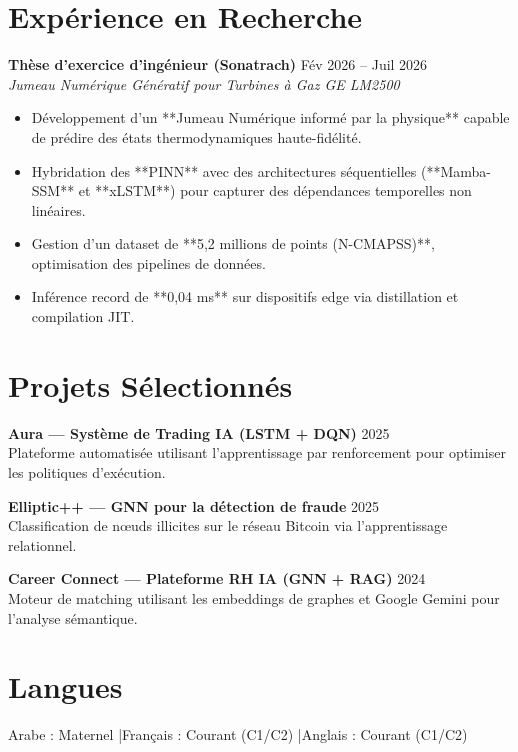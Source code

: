 \documentclass[a4paper,11pt]{article}
\begin{document}
\section{Expérience en Recherche}
\textbf{Thèse d'exercice d'ingénieur (Sonatrach)} \hfill Fév 2026 -- Juil 2026 \\
\textit{Jumeau Numérique Génératif pour Turbines à Gaz GE LM2500}
\begin{itemize}
    \item Développement d'un **Jumeau Numérique informé par la physique** capable de prédire des états thermodynamiques haute-fidélité.
    \item Hybridation des **PINN** avec des architectures séquentielles (**Mamba-SSM** et **xLSTM**) pour capturer des dépendances temporelles non linéaires.
    \item Gestion d'un dataset de **5,2 millions de points (N-CMAPSS)**, optimisation des pipelines de données.
    \item Inférence record de **0,04 ms** sur dispositifs edge via distillation et compilation JIT.
\end{itemize}

\section{Projets Sélectionnés}
\textbf{Aura — Système de Trading IA (LSTM + DQN)} \hfill 2025 \\
Plateforme automatisée utilisant l'apprentissage par renforcement pour optimiser les politiques d'exécution.

\textbf{Elliptic++ — GNN pour la détection de fraude} \hfill 2025 \\
Classification de nœuds illicites sur le réseau Bitcoin via l'apprentissage relationnel.

\textbf{Career Connect — Plateforme RH IA (GNN + RAG)} \hfill 2024 \\
Moteur de matching utilisant les embeddings de graphes et Google Gemini pour l'analyse sémantique.

\section{Langues}
Arabe : Maternel \quad|\quad Français : Courant (C1/C2) \quad|\quad Anglais : Courant (C1/C2)
\end{document}
